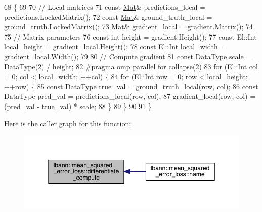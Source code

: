 \begin{DoxyCode}
68                                                                           \{
69 
70   \textcolor{comment}{// Local matrices}
71   \textcolor{keyword}{const} \hyperlink{base_8hpp_a68f11fdc31b62516cb310831bbe54d73}{Mat}& predictions\_local = predictions.LockedMatrix();
72   \textcolor{keyword}{const} \hyperlink{base_8hpp_a68f11fdc31b62516cb310831bbe54d73}{Mat}& ground\_truth\_local = ground\_truth.LockedMatrix();
73   \hyperlink{base_8hpp_a68f11fdc31b62516cb310831bbe54d73}{Mat}& gradient\_local = gradient.Matrix();
74 
75   \textcolor{comment}{// Matrix parameters}
76   \textcolor{keyword}{const} \textcolor{keywordtype}{int} height = gradient.Height();
77   \textcolor{keyword}{const} El::Int local\_height = gradient\_local.Height();
78   \textcolor{keyword}{const} El::Int local\_width = gradient\_local.Width();
79 
80   \textcolor{comment}{// Compute gradient}
81   \textcolor{keyword}{const} DataType scale = DataType(2) / height;
82 \textcolor{preprocessor}{  #pragma omp parallel for collapse(2)}
83   \textcolor{keywordflow}{for} (El::Int col = 0; col < local\_width; ++col) \{
84     \textcolor{keywordflow}{for} (El::Int row = 0; row < local\_height; ++row) \{
85       \textcolor{keyword}{const} DataType true\_val = ground\_truth\_local(row, col);
86       \textcolor{keyword}{const} DataType pred\_val = predictions\_local(row, col);
87       gradient\_local(row, col) = (pred\_val - true\_val) * scale;
88     \}
89   \}
90 
91 \}
\end{DoxyCode}
Here is the caller graph for this function\+:\nopagebreak
\begin{figure}[H]
\begin{center}
\leavevmode
\includegraphics[width=350pt]{classlbann_1_1mean__squared__error__loss_aef698469d2e70a5d42e402eeca50efa3_icgraph}
\end{center}
\end{figure}
\mbox{\label{classlbann_1_1mean__squared__error__loss_a5486b4e6d6b6fbfdd6fdd381f7cbd7eb}} 
